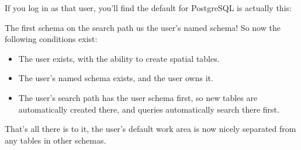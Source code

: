 \documentclass[a4paper,11pt,english]{sphinxmanual}
\begin{document}
\begin{sphinxVerbatim}[commandchars=\\\{\}]
     
    
\end{sphinxVerbatim}

If you log in as that user, you’ll find the default  for PostgreSQL is actually this:

\begin{sphinxVerbatim}[commandchars=\\\{\}]
 
\end{sphinxVerbatim}

\begin{sphinxVerbatim}[commandchars=\\\{\}]
\end{sphinxVerbatim}

The first schema on the search path us the user’s named schema! So now the following conditions exist:
\begin{itemize}
\item {} 
The user exists, with the ability to create spatial tables.

\item {} 
The user’s named schema exists, and the user owns it.

\item {} 
The user’s search path has the user schema first, so new tables are automatically created there, and queries automatically search there first.

\end{itemize}

That’s all there is to it, the user’s default work area is now nicely separated from any tables in other schemas.
\end{document}
